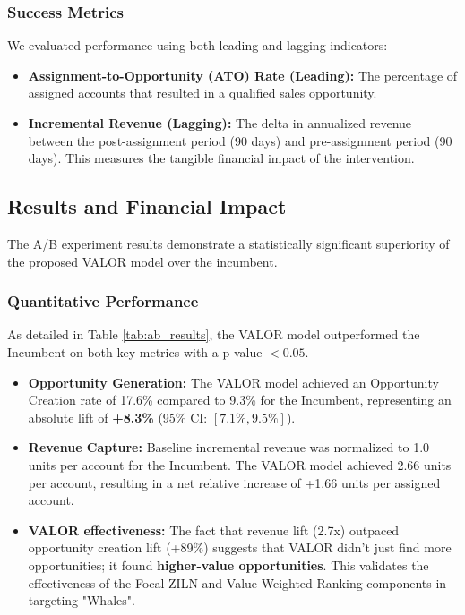 \documentclass[runningheads]{llncs}
\begin{document}
\subsubsection{Success Metrics}
We evaluated performance using both leading and lagging indicators:
\begin{itemize}
    \item \textbf{Assignment-to-Opportunity (ATO) Rate (Leading):} The percentage of assigned accounts that resulted in a qualified sales opportunity.
    \item \textbf{Incremental Revenue (Lagging):} The delta in annualized revenue between the post-assignment period (90 days) and pre-assignment period (90 days). This measures the tangible financial impact of the intervention.
\end{itemize}

\subsection{Results and Financial Impact}
The A/B experiment results demonstrate a statistically significant superiority of the proposed VALOR model over the incumbent.

\subsubsection{Quantitative Performance}
As detailed in Table \ref{tab:ab_results}, the VALOR model outperformed the Incumbent on both key metrics with a p-value $< 0.05$.
\begin{itemize}
    \item \textbf{Opportunity Generation:} The VALOR model achieved an Opportunity Creation rate of 17.6\% compared to 9.3\% for the Incumbent, representing an absolute lift of \textbf{+8.3\%} (95\% CI: $[7.1\%, 9.5\%]$).
    \item \textbf{Revenue Capture:} Baseline incremental revenue was normalized to 1.0 units per account for the Incumbent. The VALOR model achieved 2.66 units per account, resulting in a net relative increase of +1.66 units per assigned account.
    \item \textbf{VALOR effectiveness:} The fact that revenue lift (2.7x) outpaced opportunity creation lift (+89\%) suggests that VALOR didn't just find more opportunities; it found \textbf{higher-value opportunities}. This validates the effectiveness of the Focal-ZILN and Value-Weighted Ranking components in targeting "Whales".
\end{itemize}
\end{document}
